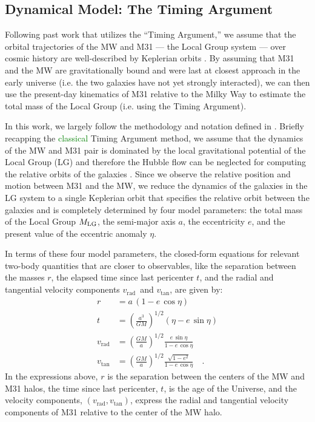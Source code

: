 \documentclass[twocolumn]{aastex631}
\newcommand{\add}[1]{\textcolor{green}{#1}}
\newcommand{\mlg}{\ensuremath{M_{\rm LG}}}
\newcommand{\vtan}{\ensuremath{v_\textrm{tan}}}
\newcommand{\vrad}{\ensuremath{v_\textrm{rad}}}
\begin{document}
\subsection{Dynamical Model: The Timing Argument}
\label{sec:timingarg}
Following past work that utilizes the ``Timing Argument,'' we assume that the
orbital trajectories of the MW and M31 --- the Local Group system --- over
cosmic history are well-described by Keplerian orbits \citep[e.g.,][]{Kahn1959,
Lynden-Bell:1981, Kroeker1991, LiWhite2008, vdm2012, Penarrubia2016}.
By assuming that M31 and the MW are gravitationally bound and were last at
closest approach in the early universe (i.e. the two galaxies have not yet
strongly interacted), we can then use the present-day kinematics of M31 relative
to the Milky Way to estimate the total mass of the Local Group (i.e. using the
Timing Argument).

In this work, we largely follow the methodology and notation defined in
\citet{Penarrubia2016}.
Briefly recapping the \add{classical} Timing Argument method, we assume that the
dynamics of the
MW and M31 pair is dominated by the local gravitational potential of the Local
Group (LG) and therefore the Hubble flow can be neglected for computing the
relative orbits of the galaxies \citep[see, e.g.,][]{Penarrubia2014}.
Since we observe the relative position and motion between M31 and the MW, we
reduce the dynamics of the galaxies in the LG system to a single Keplerian orbit
that specifies the relative orbit between the galaxies and is completely
determined by four model parameters: the total mass of the Local Group \mlg, the
semi-major axis $a$, the eccentricity $e$, and the present value of the
eccentric anomaly $\eta$.

In terms of these four model parameters, the closed-form equations for relevant
two-body quantities that are closer to observables, like the separation between
the masses $r$, the elapsed time since last pericenter $t$, and the radial and
tangential velocity components \vrad\ and \vtan, are given by:
\begin{align}
  r &= a \, (1-e\,\cos\eta) \label{eq:r} \\
  t &= \left( \frac{a^3}{GM} \right)^{1/2}(\eta-e\,\sin\eta) \label{eq:t} \\
  \vrad &= \left( \frac{GM}{a} \right)^{1/2} \frac{e\,\sin\eta}{1-e\,\cos\eta}
  \label{eq:vrad} \\
  \vtan &= \left( \frac{GM}{a} \right)^{1/2} \frac{\sqrt{1-e^2}}{1-e\,\cos\eta}
  \label{eq:vtan} \quad .
\end{align}
In the expressions above, $r$ is the separation between the centers of the MW
and M31 halos, the time since last pericenter, $t$, is the age of the Universe,
and the velocity components, $(\vrad, \vtan)$, express the radial and tangential
velocity components of M31 relative to the center of the MW halo.
\end{document}
